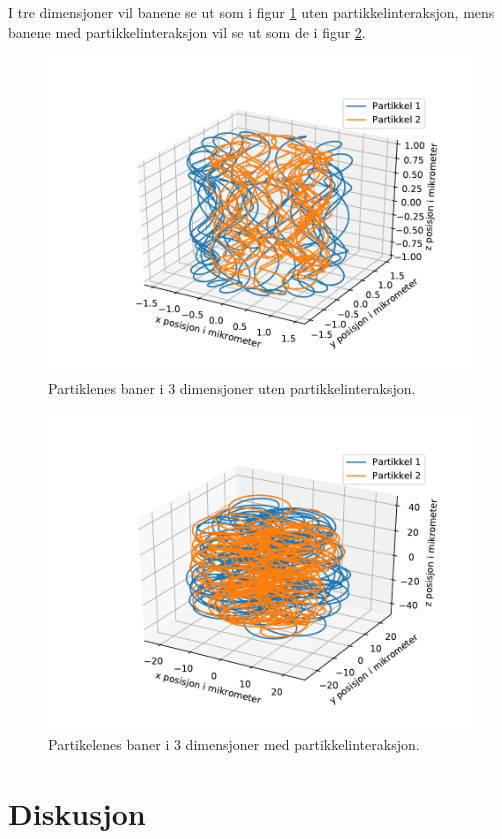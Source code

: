 \documentclass[reprint,english,notitlepage]{revtex4-1}  %
\begin{document}
I tre dimensjoner vil banene se ut som i figur \ref{3dnoint} uten partikkelinteraksjon, mens banene med partikkelinteraksjon vil se ut som de i figur \ref{3dint}.
\begin{figure}
	\label{3dnoint}
	\centering
	\includegraphics[scale=0.4]{../pythonplots/3dr2noint.pdf}
	\caption{Partiklenes baner i 3 dimensjoner uten partikkelinteraksjon.}
\end{figure}
\begin{figure}
	\label{3dint}
	\centering
	\includegraphics[scale=0.4]{../pythonplots/3dr2int.pdf}
	\caption{Partikelenes baner i 3 dimensjoner med partikkelinteraksjon.}
\end{figure}
\section{Diskusjon}
\end{document}
